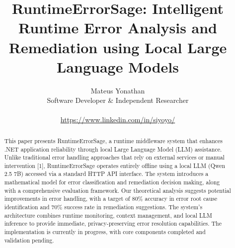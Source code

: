 \documentclass[conference,a4paper,10pt]{IEEEtran}
\title{RuntimeErrorSage: Intelligent Runtime Error Analysis and Remediation using Local Large Language Models}
\author{Mateus Yonathan \\ Software Developer \& Independent Researcher \\ \\ \url{https://www.linkedin.com/in/siyoyo/}}
\date{}
\begin{document}
\maketitle

\begin{abstract}
This paper presents RuntimeErrorSage, a runtime middleware system that enhances .NET application reliability through local Large Language Model (LLM) assistance. Unlike traditional error handling approaches that rely on external services or manual intervention [1], RuntimeErrorSage operates entirely offline using a local LLM (Qwen 2.5 7B) accessed via a standard HTTP API interface. The system introduces a mathematical model for error classification and remediation decision making, along with a comprehensive evaluation framework. Our theoretical analysis suggests potential improvements in error handling, with a target of 80\% accuracy in error root cause identification and 70\% success rate in remediation suggestions. The system's architecture combines runtime monitoring, context management, and local LLM inference to provide immediate, privacy-preserving error resolution capabilities. The implementation is currently in progress, with core components completed and validation pending.
\end{abstract}














\balance %
\end{document}
